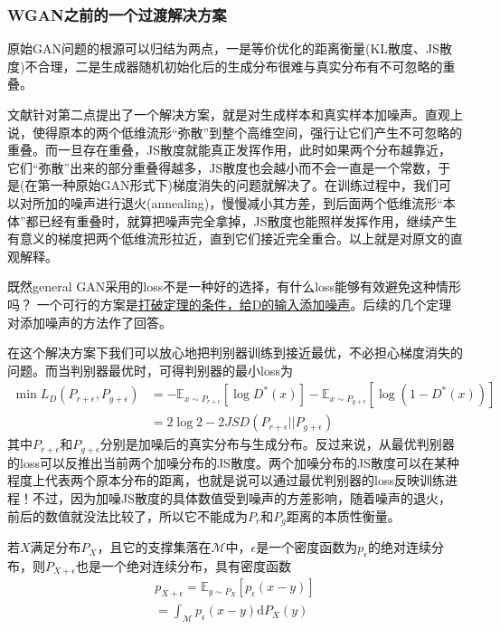         \subsubsection{WGAN之前的一个过渡解决方案}
            \par
            原始GAN问题的根源可以归结为两点，一是等价优化的距离衡量(KL散度、JS散度)不合理，二是生成器随机初始化后的生成分布很难与真实分布有不可忽略的重叠。
            \par
            文献\cite{2017.Arjovsky}针对第二点提出了一个解决方案，就是对生成样本和真实样本加噪声。直观上说，使得原本的两个低维流形“弥散”到整个高维空间，强行让它们产生不可忽略的重叠。而一旦存在重叠，JS散度就能真正发挥作用，此时如果两个分布越靠近，它们“弥散”出来的部分重叠得越多，JS散度也会越小而不会一直是一个常数，于是(在第一种原始GAN形式下)梯度消失的问题就解决了。在训练过程中，我们可以对所加的噪声进行退火(annealing)，慢慢减小其方差，到后面两个低维流形“本体”都已经有重叠时，就算把噪声完全拿掉，JS散度也能照样发挥作用，继续产生有意义的梯度把两个低维流形拉近，直到它们接近完全重合。以上就是对原文的直观解释。
            \par
            既然general GAN采用的loss不是一种好的选择，有什么loss能够有效避免这种情形吗？
            一个可行的方案是\uline{打破定理的条件，给D的输入添加噪声}。后续的几个定理对添加噪声的方法作了回答。
            \par
            在这个解决方案下我们可以放心地把判别器训练到接近最优，不必担心梯度消失的问题。而当判别器最优时，可得判别器的最小loss为
            \begin{align}
            \min L_D(P_{r+\epsilon}, P_{g+\epsilon}) &= - \mathbb{E}_{x\sim P_{r+\epsilon}}[\log D^*(x)] - \mathbb{E}_{x\sim P_{g+\epsilon}}[\log(1-D^*(x))] \\ &= 2\log 2 - 2JSD(P_{r+\epsilon} || P_{g+\epsilon})
            \end{align}
            其中$P_{r+\epsilon}$和$P_{g+\epsilon}$分别是加噪后的真实分布与生成分布。反过来说，从最优判别器的loss可以反推出当前两个加噪分布的JS散度。两个加噪分布的JS散度可以在某种程度上代表两个原本分布的距离，也就是说可以通过最优判别器的loss反映训练进程！不过，因为加噪JS散度的具体数值受到噪声的方差影响，随着噪声的退火，前后的数值就没法比较了，所以它不能成为$P_r$和$P_g$距离的本质性衡量。
            \begin{theorem}[Theorem 3.1]
            若$X$满足分布$P_X$，且它的支撑集落在$\mathcal{M}$中，$\epsilon$是一个密度函数为$p_\epsilon$的绝对连续分布，则$P_{X+\epsilon}$也是一个绝对连续分布，具有密度函数
            \begin{align*}
            p_{X+\epsilon} = \mathbb{E}_{y\sim P_X}[p_\epsilon(x-y)]\\
            =\int_\mathcal{M}p_{\epsilon}(x-y)\mathrm{d}P_X(y)
            \end{align*}
            \end{theorem}
